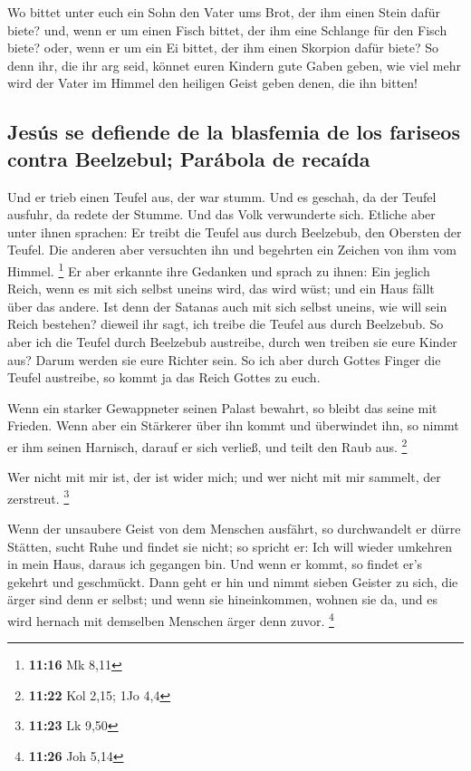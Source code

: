  Wo bittet unter euch ein Sohn den Vater ums Brot, der
ihm einen Stein dafür biete? und, wenn er um einen Fisch bittet, der ihm
eine Schlange für den Fisch biete?  oder, wenn er um ein
Ei bittet, der ihm einen Skorpion dafür biete?  So denn
ihr, die ihr arg seid, könnet euren Kindern gute Gaben geben, wie viel
mehr wird der Vater im Himmel den heiligen Geist geben denen, die ihn
bitten!

\hypertarget{jesuxfas-se-defiende-de-la-blasfemia-de-los-fariseos-contra-beelzebul-paruxe1bola-de-recauxedda}{%
\subsection{Jesús se defiende de la blasfemia de los fariseos contra
Beelzebul; Parábola de
recaída}\label{jesuxfas-se-defiende-de-la-blasfemia-de-los-fariseos-contra-beelzebul-paruxe1bola-de-recauxedda}}

 Und er trieb einen Teufel aus, der war stumm. Und es
geschah, da der Teufel ausfuhr, da redete der Stumme. Und das Volk
verwunderte sich.  Etliche aber unter ihnen sprachen: Er
treibt die Teufel aus durch Beelzebub, den Obersten der Teufel.
 Die anderen aber versuchten ihn und begehrten ein
Zeichen von ihm vom Himmel. \footnote{\textbf{11:16} Mk 8,11}
 Er aber erkannte ihre Gedanken und sprach zu ihnen: Ein
jeglich Reich, wenn es mit sich selbst uneins wird, das wird wüst; und
ein Haus fällt über das andere.  Ist denn der Satanas
auch mit sich selbst uneins, wie will sein Reich bestehen? dieweil ihr
sagt, ich treibe die Teufel aus durch Beelzebub.  So aber
ich die Teufel durch Beelzebub austreibe, durch wen treiben sie eure
Kinder aus? Darum werden sie eure Richter sein.  So ich
aber durch Gottes Finger die Teufel austreibe, so kommt ja das Reich
Gottes zu euch.

 Wenn ein starker Gewappneter seinen Palast bewahrt, so
bleibt das seine mit Frieden.  Wenn aber ein Stärkerer
über ihn kommt und überwindet ihn, so nimmt er ihm seinen Harnisch,
darauf er sich verließ, und teilt den Raub aus. \footnote{\textbf{11:22}
  Kol 2,15; 1Jo 4,4}

 Wer nicht mit mir ist, der ist wider mich; und wer nicht
mit mir sammelt, der zerstreut. \footnote{\textbf{11:23} Lk 9,50}

 Wenn der unsaubere Geist von dem Menschen ausfährt, so
durchwandelt er dürre Stätten, sucht Ruhe und findet sie nicht; so
spricht er: Ich will wieder umkehren in mein Haus, daraus ich gegangen
bin.  Und wenn er kommt, so findet er's gekehrt und
geschmückt.  Dann geht er hin und nimmt sieben Geister zu
sich, die ärger sind denn er selbst; und wenn sie hineinkommen, wohnen
sie da, und es wird hernach mit demselben Menschen ärger denn zuvor.
\footnote{\textbf{11:26} Joh 5,14}

